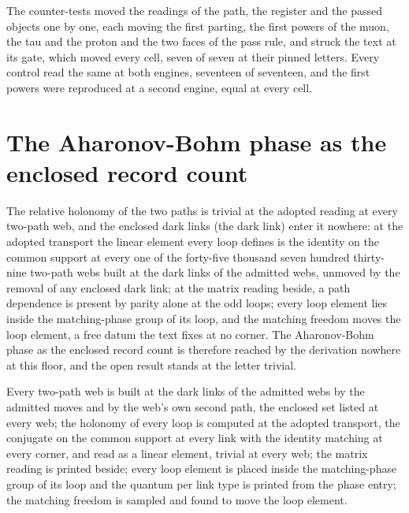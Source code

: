 \begin{chproof}[finite]
The counter-tests moved the readings of the path, the register and the passed objects one by one, each moving the first parting, the first powers of the muon, the tau and the proton and the two faces of the pass rule, and struck the text at its gate, which moved every cell, seven of seven at their pinned letters. Every control read the same at both engines, seventeen of seventeen, and the first powers were reproduced at a second engine, equal at every cell.
\end{chproof}
\section{The Aharonov-Bohm phase as the enclosed record count}\label{mod:I-3-D535921-w-abrc}
\begin{chwall}\label{box:I-3-D535921-w-abrc:1}
The relative holonomy of the two paths is trivial at the adopted reading at every two-path web, and the enclosed dark links (the dark link) enter it nowhere: at the adopted transport the linear element every loop defines is the identity on the common support at every one of the forty-five thousand seven hundred thirty-nine two-path webs built at the dark links of the admitted webs, unmoved by the removal of any enclosed dark link; at the matrix reading beside, a path dependence is present by parity alone at the odd loops; every loop element lies inside the matching-phase group of its loop, and the matching freedom moves the loop element, a free datum the text fixes at no corner. The Aharonov-Bohm phase as the enclosed record count is therefore reached by the derivation nowhere at this floor, and the open result stands at the letter trivial.
\end{chwall}
Every two-path web is built at the dark links of the admitted webs by the admitted moves and by the web's own second path, the enclosed set listed at every web; the holonomy of every loop is computed at the adopted transport, the conjugate on the common support at every link with the identity matching at every corner, and read as a linear element, trivial at every web; the matrix reading is printed beside; every loop element is placed inside the matching-phase group of its loop and the quantum per link type is printed from the phase entry; the matching freedom is sampled and found to move the loop element.

